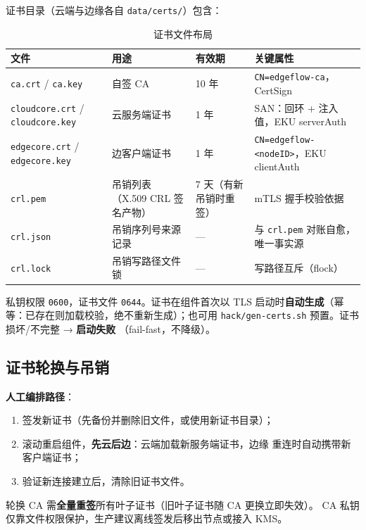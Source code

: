 证书目录（云端与边缘各自 \texttt{data/certs/}）包含：

\begin{table}[htbp]
\centering
\caption{证书文件布局}
\label{tab:8-certs}
\begin{tabularx}{\textwidth}{l l l X}
\toprule
\textbf{文件} & \textbf{用途} & \textbf{有效期} & \textbf{关键属性} \\
\midrule
\texttt{ca.crt} / \texttt{ca.key} & 自签 CA & 10 年 & \texttt{CN=edgeflow-ca}，CertSign \\
\texttt{cloudcore.crt} / \texttt{cloudcore.key} & 云服务端证书 & 1 年 & SAN：回环 + 注入值，EKU serverAuth \\
\texttt{edgecore.crt} / \texttt{edgecore.key} & 边客户端证书 & 1 年 & \texttt{CN=edgeflow-<nodeID>}，EKU clientAuth \\
\texttt{crl.pem} & 吊销列表（X.509 CRL 签名产物） & 7 天（有新吊销时重签） & mTLS 握手校验依据 \\
\texttt{crl.json} & 吊销序列号来源记录 & — & 与 \texttt{crl.pem} 对账自愈，唯一事实源 \\
\texttt{crl.lock} & 吊销写路径文件锁 & — & 写路径互斥（flock） \\
\bottomrule
\end{tabularx}
\end{table}

私钥权限 \texttt{0600}，证书文件 \texttt{0644}。证书在组件首次以 TLS
启动时\textbf{自动生成}（幂等：已存在则加载校验，绝不重新生成）；也可用
\texttt{hack/gen-certs.sh} 预置。证书损坏/不完整 → \textbf{启动失败}
（fail-fast，不降级）。

\subsection{证书轮换与吊销}

\textbf{人工编排路径}：

\begin{enumerate}
  \item 签发新证书（先备份并删除旧文件，或使用新证书目录）；
  \item 滚动重启组件，\textbf{先云后边}：云端加载新服务端证书，边缘
        重连时自动携带新客户端证书；
  \item 验证新连接建立后，清除旧证书文件。
\end{enumerate}

轮换 CA 需\textbf{全量重签}所有叶子证书（旧叶子证书随 CA 更换立即失效）。
CA 私钥仅靠文件权限保护，生产建议离线签发后移出节点或接入 KMS。

